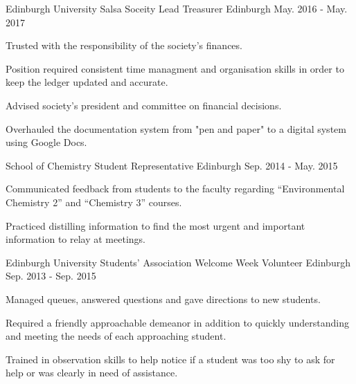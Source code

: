 

\begin{cventries}

  \cventry
    {Edinburgh University Salsa Soceity} %
    {Lead Treasurer} %
    {Edinburgh} %
    {May. 2016 - May. 2017} %
    {
      \begin{cvitems} %
        \item {Trusted with the responsibility of the society's finances.}
        \item {Position required consistent time managment and organisation skills in order to keep the ledger updated and accurate.}
        \item {Advised society's president and committee on financial decisions.}
        \item {Overhauled the documentation system from "pen and paper" to a digital system using Google Docs.}
      \end{cvitems}
    }

  \cventry
    {School of Chemistry} %
    {Student Representative} %
    {Edinburgh} %
    {Sep. 2014 - May. 2015} %
    {
      \begin{cvitems} %
        \item {Communicated feedback from students to the faculty regarding “Environmental Chemistry 2” and “Chemistry 3” courses.}
        \item {Practiced distilling information to find the most urgent and important information to relay at meetings.}
      \end{cvitems}
    }

  \cventry
    {Edinburgh University Students' Association} %
    {Welcome Week Volunteer} %
    {Edinburgh} %
    {Sep. 2013 - Sep. 2015} %
    {
      \begin{cvitems} %
        \item {Managed queues, answered questions and gave directions to new students.}
        \item {Required a friendly approachable demeanor in addition to quickly understanding and meeting the needs of each approaching student.}
        \item {Trained in observation skills to help notice if a student was too shy to ask for help or was clearly in need of assistance.}
      \end{cvitems}
    }


\end{cventries}
